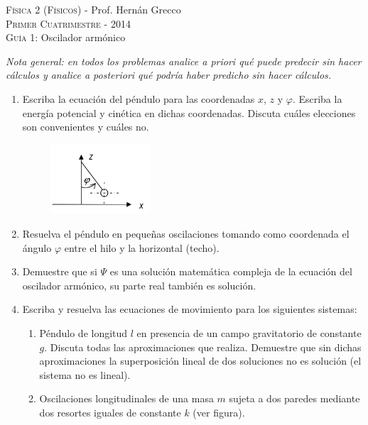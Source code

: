 \documentclass[11pt,spanish,a4paper]{article}
\begin{document}
\begin{center}
	\textsc{\large Física 2 (Físicos)} - Prof. Hernán Grecco\\
	\textsc{\large Primer Cuatrimestre - 2014}\\
	\textsc{\large Guía 1:} Oscilador armónico
\end{center}
\centering
\emph{Nota general: en todos los problemas analice a priori qué puede predecir sin
	hacer cálculos y analice a posteriori qué podría haber predicho sin hacer
cálculos.}


\begin{enumerate}


\item Escriba la ecuación del péndulo para las coordenadas \(x\), \(z\) y \(\varphi\).
	Escriba la energía potencial y cinética en dichas coordenadas.
	Discuta cuáles elecciones son convenientes y cuáles no.
	\begin{figure}[h]
		\centering{}\includegraphics[width=0.35\textwidth]{guia1_e1}
	\end{figure}


\item Resuelva el péndulo en pequeñas oscilaciones tomando como coordenada el
	ángulo \(\varphi\) entre el hilo y la horizontal (techo).


\item  Demuestre que si \(\Psi\) es una solución matemática compleja de la ecuación del oscilador armónico, su parte real también es solución.


\item Escriba y resuelva las ecuaciones de movimiento para los siguientes sistemas:
	\begin{enumerate}
		\item Péndulo de longitud \(l\) en presencia de un campo gravitatorio de constante \(g\).
			Discuta todas las aproximaciones que realiza.
			Demuestre que sin dichas aproximaciones la superposición lineal de dos soluciones no es solución (el sistema no es lineal).

		\item Oscilaciones longitudinales de una masa \(m\) sujeta a dos paredes mediante dos resortes iguales de constante \(k\) (ver figura).%


\end{enumerate}
\end{enumerate}
\end{document}
